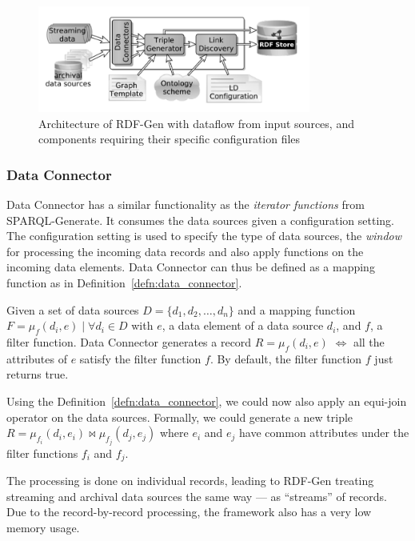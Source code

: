 \begin{figure}[!htbp]
  \centering
  \includegraphics[width=0.8\textwidth]{fig/rdf-gen-arch.png}
  \caption{Architecture of RDF-Gen with dataflow from input sources, and 
  components requiring their specific configuration files~\cite{rdf_gen}}
  \label{fig:rdf-gen-arch}
\end{figure}

\subsubsection{Data Connector}
Data Connector has a similar functionality as the \emph{iterator functions} from SPARQL-Generate.
It consumes the data sources given a configuration setting. The configuration setting is used to specify 
the type of data sources, the \emph{window} for processing the incoming data records and 
also apply functions on the incoming data elements. Data Connector can thus be defined as a 
mapping function as in Definition~\ref{defn:data_connector}. 


\begin{defn}
  \label{defn:data_connector}
  Given a set of data sources $D = \{d_1, d_2, \dots, d_n\}$ and  a 
  mapping function $F = \mu_{f}(d_i, e)\; |\; \forall d_i \in D$ with $e$, a data element 
  of a data source $d_i$, and $f$, a filter function. Data Connector 
  generates a record $R = \mu_{f}(d_i, e)$ $\iff$ all the attributes of 
  $e$ satisfy the filter function $f$. By default, the filter function $f$ just returns true. 
\end{defn}

Using the Definition~\ref{defn:data_connector}, we could now also apply an equi-join operator 
on the data sources. Formally, we could generate a new triple 
$R =  \mu_{f_i}(d_i, e_i) \bowtie  \mu_{f_j}(d_j, e_j) $ where $e_i$ and $e_j$ have 
common attributes under the filter functions $f_i$ and $f_j$. 

The processing is done on individual records, leading to 
RDF-Gen treating streaming and archival data sources the same way --- as “streams” 
of records. Due to the record-by-record processing, the framework also has a very low 
memory usage. 

